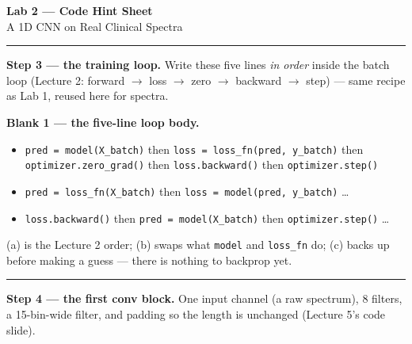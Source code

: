 \documentclass[11pt]{article}
\newcommand{\opt}[1]{\texttt{#1}}
\begin{document}
\small

\begin{center}
{\Large \textbf{Lab 2 --- Code Hint Sheet}}\\[2pt]
{\normalsize A 1D CNN on Real Clinical Spectra}
\end{center}

\vspace{-2pt}
\begin{center}
\end{center}

\vspace{2pt}\hrule\vspace{4pt}

\textbf{Step 3 --- the training loop.}\; {\small Write these five lines \emph{in order} inside the
batch loop (Lecture 2: forward $\to$ loss $\to$ zero $\to$ backward $\to$ step) --- same recipe
as Lab 1, reused here for spectra.}

\textbf{Blank 1 --- the five-line loop body.}
\begin{itemize}
  \item[(a)] \opt{pred = model(X\_batch)} \quad then \quad \opt{loss = loss\_fn(pred, y\_batch)} \quad then\\
    \opt{optimizer.zero\_grad()} \quad then \quad \opt{loss.backward()} \quad then \quad \opt{optimizer.step()}
  \item[(b)] \opt{pred = loss\_fn(X\_batch)} \quad then \quad \opt{loss = model(pred, y\_batch)} \quad \ldots
  \item[(c)] \opt{loss.backward()} \quad then \quad \opt{pred = model(X\_batch)} \quad then \quad \opt{optimizer.step()} \quad \ldots
\end{itemize}
{\small (a) is the Lecture 2 order; (b) swaps what \texttt{model} and \texttt{loss\_fn} do; (c) backs
up before making a guess --- there is nothing to backprop yet.}

\vspace{3pt}\hrule\vspace{4pt}

\textbf{Step 4 --- the first conv block.}\; {\small One input channel (a raw spectrum), 8 filters,
a 15-bin-wide filter, and padding so the length is unchanged (Lecture 5's code slide).}
\end{document}
